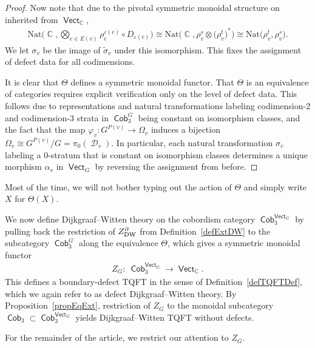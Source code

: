 \documentclass[10pt,a4paper]{amsart}
\DeclareMathOperator{\vect}{\mathsf{Vect}}
\DeclareMathOperator{\Fun}{\mathsf{Fun}}
\DeclareMathOperator{\C}{\mathbb{C}}
\DeclareMathOperator{\Cob}{\mathsf{Cob}}
\DeclareMathOperator{\cald}{\mathcal{D}}
\numberwithin{equation}{section}
\theoremstyle{definition}
\begin{document}
\begin{proof}
 Now note that due to the pivotal symmetric monoidal structure on \smash{$\vect_{\C}^{\cald_v} = \Fun(\mathcal{D}_v, \vect_{\C})$} inherited from $\vect_{\C}$,
 \begin{align*}
 \mathrm{Nat}\biggl(\C, \bigotimes_{e \in E(v)} \rho_e^{\varepsilon(e)}\circ D_{\varepsilon(e)}\biggr) \cong \mathrm{Nat}\bigl(\C, \rho_v^s \otimes \bigl(\rho_v^t\bigr)^*\bigr) \cong \mathrm{Nat}\bigl( \rho_v^t, \rho_v^s \bigr).
 \end{align*}
 We let $\sigma_v$ be the image of $\widetilde{\sigma}_v$ under this isomorphism. This fixes the assignment of defect data for all codimensions.

 It is clear that $\Theta$ defines a symmetric monoidal functor. That $\Theta$ is an equivalence of categories requires explicit verification only on the level of defect data. This follows due to representations and natural transformations labeling codimension-2 and codimension-3 strata in $\Cob_3^G$ being constant on isomorphism classes, and the fact that the map $\varphi_v\colon G^{P(v)} \rightarrow \Omega_v$ induces a bijection $\Omega_v \cong G^{P(v)}/G = \pi_0(\cald_v)$. In particular, each natural transformation $\sigma_v$ labeling a 0-stratum that is constant on isomorphism classes determines a unique morphism $\alpha_v$ in $\vect_G$ by reversing the assignment from before.
\end{proof}

Most of the time, we will not bother typing out the action of $\Theta$ and simply write $X$ for $\Theta(X)$.

We now define Dijkgraaf--Witten theory on the cobordism category $\Cob_3^{\vect_G}$ by pulling back the restriction of $Z_{\rm DW}^{\partial}$ from Definition~\ref{defExtDW} to the subcategory $ \Cob_3^G$ along the equivalence $\Theta$, which gives a symmetric monoidal functor
\begin{align*}
 Z_G\colon \ \Cob_3^{\vect_G} \rightarrow \vect_{\C}.
\end{align*}
This defines a boundary-defect TQFT in the sense of Definition~\ref{defTQFTDef}, which we again refer to as defect Dijkgraaf--Witten theory. By Proposition~\ref{propEqExt}, restriction of $Z_G$ to the monoidal subcategory $\Cob_3 \subset \Cob_3^{\vect_G}$ yields Dijkgraaf--Witten TQFT without defects.

For the remainder of the article, we restrict our attention to $Z_G$.
\end{document}
